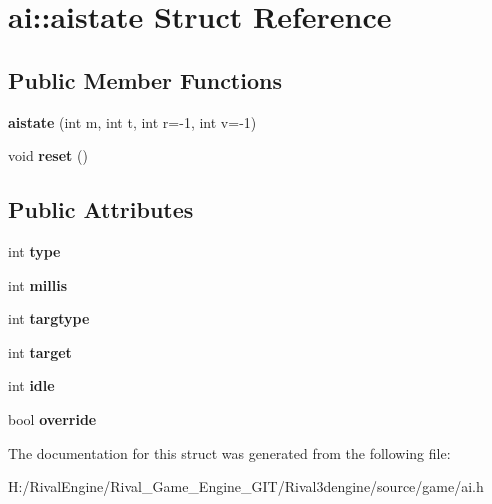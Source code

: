 \hypertarget{structai_1_1aistate}{}\section{ai\+:\+:aistate Struct Reference}
\label{structai_1_1aistate}
\subsection*{Public Member Functions}
\begin{DoxyCompactItemize}
\item 
\mbox{\label{structai_1_1aistate_ae579c64025949de7b61185b846f2b79f}} 
{\bfseries aistate} (int m, int t, int r=-\/1, int v=-\/1)
\item 
\mbox{\label{structai_1_1aistate_a5b0b1e2a38f2d7465a2452797ea9686b}} 
void {\bfseries reset} ()
\end{DoxyCompactItemize}
\subsection*{Public Attributes}
\begin{DoxyCompactItemize}
\item 
\mbox{\label{structai_1_1aistate_af56130d732c388013b978b3a8419d7fc}} 
int {\bfseries type}
\item 
\mbox{\label{structai_1_1aistate_a17ec6a5188ba690468a604da77c6f590}} 
int {\bfseries millis}
\item 
\mbox{\label{structai_1_1aistate_a743f690a40bea72f8e52a9b985a53c9b}} 
int {\bfseries targtype}
\item 
\mbox{\label{structai_1_1aistate_a272a0a022f7c2e708f5dab7d884e7eb5}} 
int {\bfseries target}
\item 
\mbox{\label{structai_1_1aistate_ad968de0c5c108b30b01c84fb714c9f1f}} 
int {\bfseries idle}
\item 
\mbox{\label{structai_1_1aistate_a81a74a3416fd831462580f5cfc6ced56}} 
bool {\bfseries override}
\end{DoxyCompactItemize}


The documentation for this struct was generated from the following file\+:\begin{DoxyCompactItemize}
\item 
H\+:/\+Rival\+Engine/\+Rival\+\_\+\+Game\+\_\+\+Engine\+\_\+\+G\+I\+T/\+Rival3dengine/source/game/ai.\+h\end{DoxyCompactItemize}
